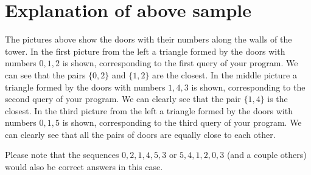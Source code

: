 \medskip

\begin{center}
\end{center}

\medskip

\section*{Explanation of above sample}
The pictures above show the doors with their numbers along the walls of the tower.
In the first picture from the left
a triangle formed by the doors with numbers $0, 1, 2$ is shown, corresponding to the first query of
your program. We can see that the pairs
$\{0,2\}$ and $\{1,2\}$ are the closest. In the middle picture a triangle formed by the doors with numbers
$1, 4, 3$ is shown, corresponding to the second query of your program.
We can clearly see that the pair $\{1,4\}$ is the closest. In the third picture from the left
a triangle formed by the doors with numbers $0, 1, 5$ is shown, corresponding to the third query
of your program. We can clearly see that all the pairs of doors
are equally close to each other.

Please note that the sequences $0,2,1,4,5,3$ or $5,4,1,2,0,3$ (and a couple others)
would also be correct answers in this case.

